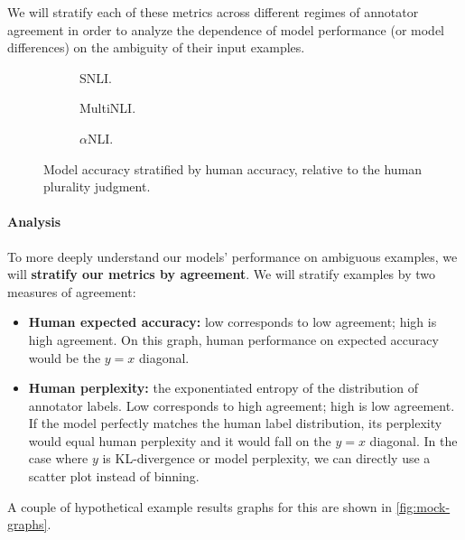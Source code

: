 \documentclass[10pt,a4paper]{article}
\begin{document}
We will stratify each of these metrics across different regimes of annotator agreement in order to
analyze the dependence of model performance (or model differences) on the ambiguity of their input
examples.

\begin{figure*}[t!]
\centering
\begin{subfigure}[b]{0.3\textwidth}
\caption{SNLI.}
\end{subfigure}

\hfill
\begin{subfigure}[b]{0.3\textwidth}
\caption{MultiNLI.}
\end{subfigure}

\hfill
\begin{subfigure}[b]{0.3\textwidth}
  \caption{$\alpha$NLI.}
\end{subfigure}

\caption{
  Model accuracy stratified by human accuracy, relative to the human plurality judgment.\label{fig:accuracy}
  \label{fig:acc-graphs}}
\end{figure*}


\paragraph{Analysis}
To more deeply understand our models' performance on ambiguous examples, we will \textbf{stratify our metrics by agreement}. We will stratify examples by two measures of agreement:
\begin{itemize}
    \item \textbf{Human expected accuracy:} low corresponds to low agreement; high is high agreement. On this graph, human performance on expected accuracy would be the $y=x$ diagonal.
    \item \textbf{Human perplexity:} the exponentiated entropy of the distribution of annotator labels. Low corresponds to high agreement; high is low agreement. If the model perfectly matches the human label distribution, its perplexity would equal human perplexity and it would fall on the $y=x$ diagonal. In the case where $y$ is KL-divergence or model perplexity, we can directly use a scatter plot instead of binning.
\end{itemize}
A couple of hypothetical example results graphs for this are shown in \autoref{fig:mock-graphs}.
\end{document}
